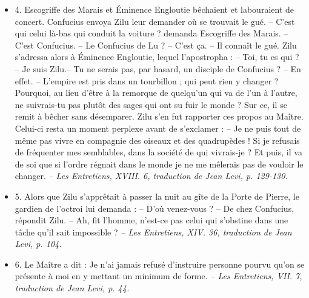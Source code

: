 \begin{itemize}
{}
\item 4. \newline Escogriffe des Marais  et Éminence Engloutie bêchaient et labouraient de concert. Confucius envoya Zilu leur demander où se trouvait le gué. \newline -- C’est qui celui là-bas qui conduit la voiture ? demanda Escogriffe des Marais. \newline -- C’est Confucius. \newline -- Le Confucius de Lu ? \newline -- C’est ça. \newline -- Il connaît le gué.  \newline Zilu s’adressa alors à Éminence Engloutie, lequel l’apostropha :  \newline -- Toi, tu es qui ? \newline -- Je suis Zilu.\newline  -- Tu ne serais pas, par hasard, un disciple de Confucius ? \newline -- En effet.  \newline -- L’empire est pris dans un tourbillon ; qui peut rien y changer ? Pourquoi, au lieu d’être à la remorque de quelqu’un qui va de l’un à l’autre, ne suivrais-tu pas plutôt des sages qui ont su fuir le monde ? \newline  Sur ce, il se remit à bêcher sans désemparer. Zilu s’en fut rapporter ces propos au Maître. Celui-ci resta un moment perplexe avant de s’exclamer :  \newline  -- Je ne puis tout de même pas vivre en compagnie des oiseaux et des quadrupèdes ! Si je refusais de fréquenter mes semblables, dans la société de qui vivrais-je ? Et puis, il va de soi que si l’ordre régnait dans le monde je ne me mêlerais pas de vouloir le changer.  \textit{\small -- Les Entretiens, XVIII. 6, traduction de Jean Levi, p. 129-130.  }

\item 5. \newline Alors que Zilu s’apprêtait à passer la nuit au gîte de la Porte de Pierre, le gardien de l’octroi lui demanda : \newline-- D’où venez-vous ? \newline -- De chez Confucius, répondit Zilu. \newline-- Ah, fit l’homme, n’est-ce pas celui qui s’obstine dans une tâche qu’il sait impossible ?  \textit{\small -- Les Entretiens, XIV. 36, traduction de Jean Levi, p. 104.  }
\item 6. \newline Le Maître a dit : Je n’ai jamais refusé d’instruire personne pourvu qu’on se présente à moi en y mettant un minimum de forme. \textit{\small -- Les Entretiens, VII. 7, traduction de Jean Levi, p. 44.   
}
\end{itemize}

